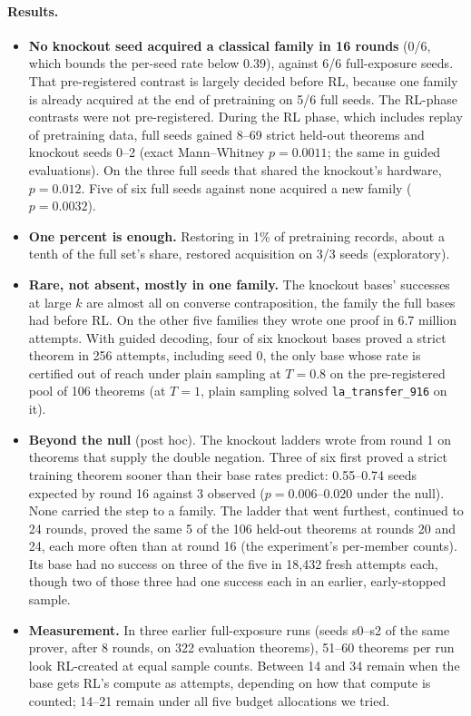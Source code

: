 \paragraph{Results.}
\begin{itemize}
\item \textbf{No knockout seed acquired a classical family in 16 rounds} (0/6, which bounds the per-seed rate below
0.39), against 6/6 full-exposure seeds. That pre-registered contrast is largely decided before RL, because one family is
already acquired at the end of pretraining on 5/6 full seeds. The RL-phase contrasts were not pre-registered. During the
RL phase, which includes replay of pretraining data, full seeds gained 8--69 strict held-out theorems and knockout seeds
0--2 (exact Mann--Whitney $p=0.0011$; the same in guided evaluations). On the three full seeds that shared the
knockout's hardware, $p=0.012$. Five of six full seeds against none acquired a new family ($p=0.0032$).
\item \textbf{One percent is enough.} Restoring \sig{} in 1\% of pretraining records, about a tenth of the full set's
share, restored acquisition on 3/3 seeds (exploratory).
\item \textbf{Rare, not absent, mostly in one family.} The knockout bases' successes at large $k$ are almost all on
converse contraposition, the family the full bases had before RL. On the other five families they wrote one \sig{}
proof in 6.7 million attempts. With guided decoding, four of six knockout bases proved a strict theorem in 256
attempts, including seed 0, the only base whose rate is certified out of reach under plain sampling at $T=0.8$ on
the pre-registered pool of 106 theorems (at $T=1$, plain sampling solved \texttt{la\_transfer\_916} on it).
\item \textbf{Beyond the null} (post hoc). The knockout ladders wrote \sig{} from round 1 on theorems that supply the
double negation. Three of six first proved a strict training theorem sooner than their base rates predict: 0.55--0.74 seeds
expected by round 16 against 3 observed ($p = 0.006$--$0.020$ under the null). None carried the step to a family. The
ladder that went furthest, continued to 24 rounds, proved the same 5 of the 106 held-out theorems at rounds 20 and 24,
each more often than at round 16 (the experiment's per-member counts). Its base had no success on three of the five in 18,432 fresh attempts each, though two of those three had one success
each in an earlier, early-stopped sample.
\item \textbf{Measurement.} In three earlier full-exposure runs (seeds s0--s2 of the same prover, after 8 rounds,
on 322 evaluation theorems), 51--60 theorems per run look RL-created at equal sample counts. Between 14 and 34
remain when the base gets RL's compute as attempts, depending on how that compute is counted; 14--21 remain under all
five budget allocations we tried.
\end{itemize}

